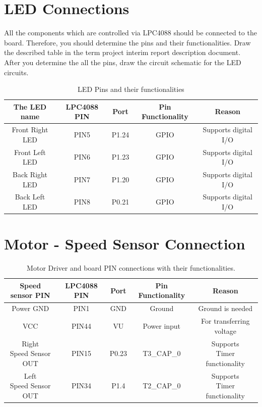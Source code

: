 \documentclass[12pt]{article}
\begin{document}
\newpage
\section{LED Connections}

All the components which are controlled via LPC4088 should be connected to the board. Therefore, you should determine the pins and their functionalities. Draw the described table in the term project interim report description document. After you determine the all the pins, draw the circuit schematic for the LED circuits. \\

\begin{center}
\begin {table}[H]
\begin{tabular}{|c|c|c|c|c|}
\hline
The LED name & LPC4088 PIN & Port & Pin Functionality & Reason \\\hline
Front Right LED & PIN5 & P1.24 & GPIO & Supports digital I/O \\\hline
Front Left LED & PIN6 & P1.23 & GPIO & Supports digital I/O \\\hline
Back Right LED & PIN7 & P1.20 & GPIO & Supports digital I/O \\\hline
Back Left LED & PIN8 & P0.21 & GPIO & Supports digital I/O \\\hline
\end{tabular}
\caption{LED Pins and their functionalities}
\end{table}
\end{center}


\newpage
\section{Motor - Speed Sensor Connection}

\begin {table}[H]
\begin{center}
\begin{tabular}{|c|c|c|c|c|}
\hline
Speed sensor PIN & LPC4088 PIN & Port & Pin Functionality & Reason \\\hline
Power GND & PIN1 & GND & Ground & Ground is needed \\\hline
VCC & PIN44 & VU & Power input & For transferring voltage \\\hline
\shortstack{Right\\ Speed Sensor \\OUT} & PIN15 & P0.23 & T3\_CAP\_0 & \shortstack{Supports\\ Timer functionality} \\\hline
\shortstack{Left\\ Speed Sensor \\OUT} & PIN34 & P1.4 & T2\_CAP\_0 & \shortstack{Supports\\ Timer functionality} \\\hline
\end{tabular}
\caption{Motor Driver and board PIN connections with their functionalities.}
\end{center}
\end{table}
\end{document}

